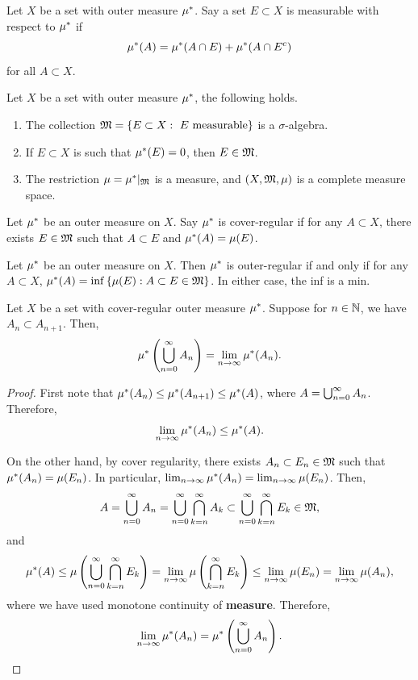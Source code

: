 \documentclass[a4paper]{article}
\begin{document}
\begin{defi}
  Let $X$ be a set with outer measure $\mu^*$. Say
  a set $E \subset X$ is measurable with respect to
  $\mu^*$ if
  \[
  \mu^*(A) = \mu^*(A \cap E) + \mu^*(A \cap E^c)
  \]
  for all $A \subset X$.
\end{defi}

\begin{thm}
  Let $X$ be a set with outer measure $\mu^*$, the following
  holds.
  \begin{enumerate}
    \item The collection $\mathfrak{M} = \left\{ E \subset X: \text{
      $E$ measurable} \right\}$
      is a $\sigma$-algebra.
    \item If $E \subset X$ is such that $\mu^*(E) = 0$, then
    $E \in \mathfrak{M}$.
    \item The restriction $\mu = \mu^* \vert_{\mathfrak{M}}$ is a measure,
    and $(X, \mathfrak{M}, \mu)$ is a complete measure space.
  \end{enumerate}
\end{thm}

\begin{defi}
  Let $\mu^*$ be an outer measure on $X$. Say $\mu^*$
  is cover-regular if for any $A \subset X$, there
  exists $E \in \mathfrak{M}$ such that $A \subset E$
  and $\mu^*(A) = \mu(E)$.
\end{defi}

\begin{prop}
  Let $\mu^*$ be an outer measure on $X$. Then $\mu^*$
  is outer-regular if and only if for any $A \subset X$,
  $\mu^*(A) = \inf \left\{ \mu(E) : A \subset E \in
  \mathfrak{M} \right\}$. In either case, the inf is a min.
\end{prop}

\begin{prop}
  Let $X$ be a set with cover-regular outer measure
  $\mu^*$. Suppose for $n \in \mathbb{N}$, we have $A_n \subset
  A_{n+1}$. Then,
  \[
  \mu^* \left( \bigcup_{n=0}^\infty A_n \right)
  = \lim_{n \to \infty} \mu^*(A_n).
  \]
\end{prop}

\begin{proof}
  First note that $\mu^*(A_n) \leq \mu^*(A_{n+1})
  \leq \mu^*(A)$, where $A = \bigcup_{n=0}^\infty A_n$.
  Therefore,
  \[
    \lim_{n \to \infty} \mu^*(A_n) \leq \mu^*(A).
  \]

  On the other hand, by cover regularity, there exists
  $A_n \subset E_n \in \mathfrak{M}$ such that $\mu^*(A_n) = \mu(E_n)$.
  In particular, $\lim_{n \to \infty} \mu^* (A_n)
  = \lim_{n \to \infty} \mu(E_n)$. Then,
  \[
  A = \bigcup_{n=0}^\infty A_n = \bigcup_{n=0}^\infty \bigcap_{k=n}^\infty A_k
  \subset \bigcup_{n=0}^\infty \bigcap_{k=n}^\infty E_k \in \mathfrak{M},
  \]
  and
  \[
  \begin{aligned}
    \mu^*(A)
    \leq \mu \left( \bigcup_{n=0}^\infty
    \bigcap_{k=n}^\infty E_k \right)
    = \lim_{n \to \infty} \mu \left( \bigcap_{k=n}^\infty
    E_k \right)
    \leq \lim_{n \to \infty} \mu (E_n)
    = \lim_{n \to \infty} \mu(A_n),
  \end{aligned}
  \]
  where we have used monotone continuity of \textbf{measure}.
  Therefore, 
  \[
  \lim_{n \to \infty} \mu^* (A_n) = \mu^* 
  \left( \bigcup_{n=0}^\infty A_n \right).
  \]
\end{proof}
\end{document}
